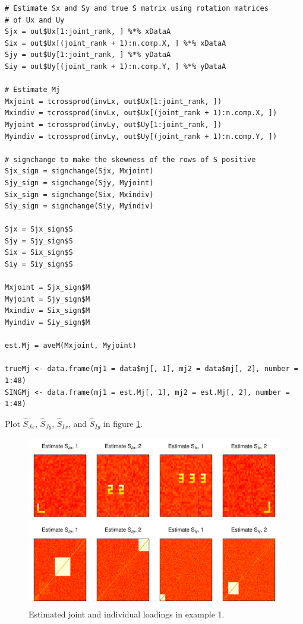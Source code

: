 \begin{verbatim}
# Estimate Sx and Sy and true S matrix using rotation matrices
# of Ux and Uy
Sjx = out$Ux[1:joint_rank, ] %*% xDataA
Six = out$Ux[(joint_rank + 1):n.comp.X, ] %*% xDataA
Sjy = out$Uy[1:joint_rank, ] %*% yDataA
Siy = out$Uy[(joint_rank + 1):n.comp.Y, ] %*% yDataA

# Estimate Mj
Mxjoint = tcrossprod(invLx, out$Ux[1:joint_rank, ])
Mxindiv = tcrossprod(invLx, out$Ux[(joint_rank + 1):n.comp.X, ])
Myjoint = tcrossprod(invLy, out$Uy[1:joint_rank, ])
Myindiv = tcrossprod(invLy, out$Uy[(joint_rank + 1):n.comp.Y, ])

# signchange to make the skewness of the rows of S positive
Sjx_sign = signchange(Sjx, Mxjoint)
Sjy_sign = signchange(Sjy, Myjoint)
Six_sign = signchange(Six, Mxindiv)
Siy_sign = signchange(Siy, Myindiv)

Sjx = Sjx_sign$S
Sjy = Sjy_sign$S
Six = Six_sign$S
Siy = Siy_sign$S

Mxjoint = Sjx_sign$M
Myjoint = Sjy_sign$M
Mxindiv = Six_sign$M
Myindiv = Siy_sign$M

est.Mj = aveM(Mxjoint, Myjoint)

trueMj <- data.frame(mj1 = data$mj[, 1], mj2 = data$mj[, 2], number = 1:48)
SINGMj <- data.frame(mj1 = est.Mj[, 1], mj2 = est.Mj[, 2], number = 1:48)
\end{verbatim}

Plot \(\widehat{S}_{Jx}\), \(\widehat{S}_{Jy}\), \(\widehat{S}_{Ix}\), and \(\widehat{S}_{Iy}\) in figure \ref{fig:estiexample1}.

\begin{figure}
\includegraphics[width=1\linewidth]{figures/Esti_example1} \caption{Estimated joint and individual loadings in example 1.}\label{fig:estiexample1}
\end{figure}

